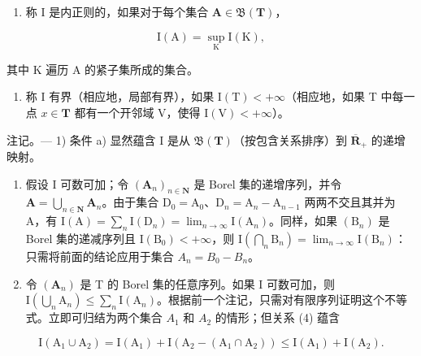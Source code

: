 \begin{enumerate}
\def\labelenumi{\alph{enumi})}
\setcounter{enumi}{1}
\tightlist
\item
  称 I 是内正则的，如果对于每个集合 \(\mathbf{A} \in \mathfrak{B}(\mathbf{T})\)，
\end{enumerate}

\[
\mathrm{I} (\mathrm{A}) = \sup _ {\mathrm{K}} \mathrm{I} (\mathrm{K}),\tag{5}
\]

其中 K 遍历 A 的紧子集所成的集合。

\begin{enumerate}
\def\labelenumi{\alph{enumi})}
\setcounter{enumi}{2}
\tightlist
\item
  称 I 有界（相应地，局部有界），如果 \(\mathrm{I(T)} < +\infty\)（相应地，如果 T 中每一点 \(x \in \mathbf{T}\) 都有一个开邻域 V，使得 \(\mathrm{I(V)} < +\infty\)）。
\end{enumerate}

注记。--- 1) 条件 a) 显然蕴含 I 是从 \(\mathfrak{B}(\mathbf{T})\)（按包含关系排序）到 \(\overline{\mathbf{R}}_{+}\) 的递增映射。

\begin{enumerate}
\def\labelenumi{\arabic{enumi})}
\setcounter{enumi}{1}
\item
  假设 I 可数可加；令 \((\mathbf{A}_n)_{n\in \mathbf{N}}\) 是 Borel 集的递增序列，并令 \(\mathbf{A} = \bigcup_{n\in \mathbf{N}}\mathbf{A}_n\)。由于集合 \(\mathrm{D}_0 = \mathrm{A}_0\)、\(\mathrm{D}_n = \mathrm{A}_n - \mathrm{A}_{n - 1}\) 两两不交且其并为 A，有 \(\mathrm{I}(\mathrm{A}) = \sum_{n} \mathrm{I}(\mathrm{D}_{n}) = \lim_{n \to \infty} \mathrm{I}(\mathrm{A}_{n})\)。同样，如果 \((\mathrm{B}_{n})\) 是 Borel 集的递减序列且 \(\mathrm{I}(\mathrm{B}_{0}) < +\infty\)，则 \(\mathrm{I}\left(\bigcap_{n} \mathrm{B}_{n}\right) = \lim_{n \to \infty} \mathrm{I}(\mathrm{B}_{n})\)：只需将前面的结论应用于集合 \(A_{n} = B_{0} - B_{n}\)。
\item
  令 \((\mathbf{A}_n)\) 是 T 的 Borel 集的任意序列。如果 I 可数可加，则 \(\mathrm{I}\left(\bigcup_{n} \mathrm{A}_n\right) \leqslant \sum_{n} \mathrm{I}(\mathrm{A}_n)\)。根据前一个注记，只需对有限序列证明这个不等式。立即可归结为两个集合 \(A_{1}\) 和 \(A_{2}\) 的情形；但关系 (4) 蕴含
\end{enumerate}

\[
\mathrm{I} \left(\mathrm{A} _ {1} \cup \mathrm{A} _ {2}\right) = \mathrm{I} \left(\mathrm{A} _ {1}\right) + \mathrm{I} \left(\mathrm{A} _ {2} - \left(\mathrm{A} _ {1} \cap \mathrm{A} _ {2}\right)\right) \leqslant \mathrm{I} \left(\mathrm{A} _ {1}\right) + \mathrm{I} \left(\mathrm{A} _ {2}\right).
\]

